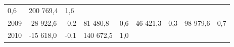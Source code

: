 \begin{longtable}[]{@{}lllllllll@{}}
\begin{minipage}[t]{0.06\columnwidth}
0,6\strut
\end{minipage} & \begin{minipage}[t]{0.08\columnwidth}\raggedright
200 769,4\strut
\end{minipage} & \begin{minipage}[t]{0.06\columnwidth}\raggedright
1,6\strut
\end{minipage}\tabularnewline
\begin{minipage}[t]{0.05\columnwidth}\raggedright
2009\strut
\end{minipage} & \begin{minipage}[t]{0.10\columnwidth}\raggedright
-28 922,6\strut
\end{minipage} & \begin{minipage}[t]{0.06\columnwidth}\raggedright
-0,2\strut
\end{minipage} & \begin{minipage}[t]{0.17\columnwidth}\raggedright
81 480,8\strut
\end{minipage} & \begin{minipage}[t]{0.06\columnwidth}\raggedright
0,6\strut
\end{minipage} & \begin{minipage}[t]{0.12\columnwidth}\raggedright
46 421,3\strut
\end{minipage} & \begin{minipage}[t]{0.06\columnwidth}\raggedright
0,3\strut
\end{minipage} & \begin{minipage}[t]{0.08\columnwidth}\raggedright
98 979,6\strut
\end{minipage} & \begin{minipage}[t]{0.06\columnwidth}\raggedright
0,7\strut
\end{minipage}\tabularnewline
\begin{minipage}[t]{0.05\columnwidth}\raggedright
2010\strut
\end{minipage} & \begin{minipage}[t]{0.10\columnwidth}\raggedright
-15 618,0\strut
\end{minipage} & \begin{minipage}[t]{0.06\columnwidth}\raggedright
-0,1\strut
\end{minipage} & \begin{minipage}[t]{0.17\columnwidth}\raggedright
140 672,5\strut
\end{minipage} & \begin{minipage}[t]{0.06\columnwidth}\raggedright
1,0\strut
\end{minipage} & \begin{minipage}[t]{0.12\columnwidth}\raggedright

\end{minipage}
\end{longtable}
